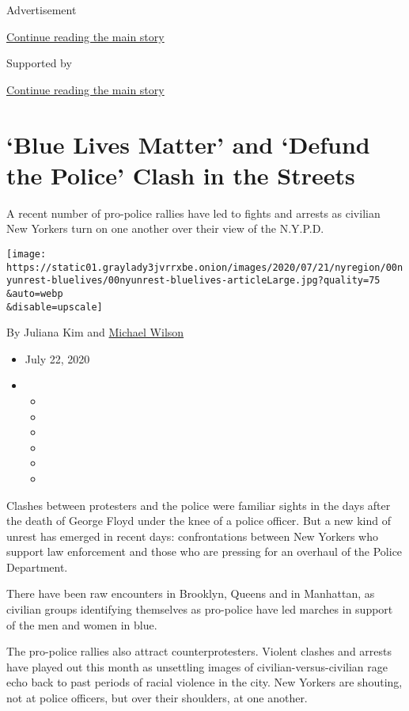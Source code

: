 Advertisement

\protect\hyperlink{after-top}{Continue reading the main story}

Supported by

\protect\hyperlink{after-sponsor}{Continue reading the main story}

\hypertarget{blue-lives-matter-and-defund-the-police-clash-in-the-streets}{%
\section{`Blue Lives Matter' and `Defund the Police' Clash in the
Streets}\label{blue-lives-matter-and-defund-the-police-clash-in-the-streets}}

A recent number of pro-police rallies have led to fights and arrests as
civilian New Yorkers turn on one another over their view of the N.Y.P.D.

\texttt{[image: https://static01.graylady3jvrrxbe.onion/images/2020/07/21/nyregion/00nyunrest-bluelives/00nyunrest-bluelives-articleLarge.jpg?quality=75\\\&auto=webp\\\&disable=upscale]}

By Juliana Kim and
\href{https://www.nytimes3xbfgragh.onion/by/michael-wilson}{Michael
Wilson}

\begin{itemize}
\item
  July 22, 2020
\item
  \begin{itemize}
  \item
  \item
  \item
  \item
  \item
  \item
  \end{itemize}
\end{itemize}

Clashes between protesters and the police were familiar sights in the
days after the death of George Floyd under the knee of a police officer.
But a new kind of unrest has emerged in recent days: confrontations
between New Yorkers who support law enforcement and those who are
pressing for an overhaul of the Police Department.

There have been raw encounters in Brooklyn, Queens and in Manhattan, as
civilian groups identifying themselves as pro-police have led marches in
support of the men and women in blue.

The pro-police rallies also attract counterprotesters. Violent clashes
and arrests have played out this month as unsettling images of
civilian-versus-civilian rage echo back to past periods of racial
violence in the city. New Yorkers are shouting, not at police officers,
but over their shoulders, at one another.

